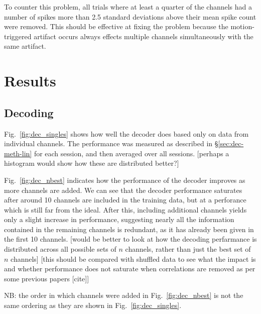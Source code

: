 To counter this problem, all trials where at least a quarter of the channels had a number of spikes more than 2.5 standard deviations above their mean spike count were removed. This should be effective at fixing the problem because the motion-triggered artifact occurs always effects multiple channels simultaneously with the same artifact.

\section{Results}

\subsection{Decoding}

Fig.~\ref{fig:dec_singles} shows how well the decoder does based only on data from individual channels. The performance was measured as described in \S\ref{sec:dec-meth-lin} for each session, and then averaged over all sessions. [perhaps a histogram would show how these are distributed better?]

Fig.~\ref{fig:dec_nbest} indicates how the performance of the decoder improves as more channels are added. We can see that the decoder performance saturates after around 10 channels are included in the training data, but at a perforance which is still far from the ideal. After this, including additional channels yields only a slight increase in performance, suggesting nearly all the information contained in the remaining channels is redundant, as it has already been given in the first 10 channels. [would be better to look at how the decoding perfarmance is distributed across all possible sets of $n$ channels, rather than just the best set of $n$ channels] [this should be compared with shuffled data to see what the impact is and whether performance does not saturate when correlations are removed as per some previous papers [cite]]

NB: the order in which channels were added in Fig.~\ref{fig:dec_nbest} is not the same ordering as they are shown in Fig.~\ref{fig:dec_singles}.

